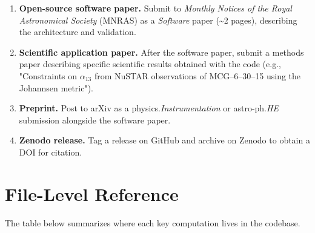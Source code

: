 \documentclass[11pt,twoside]{article}
\begin{document}
\begin{enumerate}[label=\arabic*., leftmargin=1.5em]
\item \textbf{Open-source software paper.} Submit to \textit{Monthly Notices
of the Royal Astronomical Society} (MNRAS) as a \textit{Software} paper
(\textasciitilde 2 pages), describing the architecture and validation.

\item \textbf{Scientific application paper.} After the software paper,
submit a methods paper describing specific scientific results obtained with
the code (e.g., "Constraints on $\alpha_{13}$ from NuSTAR observations of
MCG--6--30--15 using the Johannsen metric").

\item \textbf{Preprint.} Post to arXiv as a physics.\textit{Instrumentation}
or astro-ph.\textit{HE} submission alongside the software paper.

\item \textbf{Zenodo release.} Tag a release on GitHub and archive on Zenodo
to obtain a DOI for citation.
\end{enumerate}

\section{File-Level Reference}
\label{sec:file-reference}

The table below summarizes where each key computation lives in the codebase.
\end{document}
